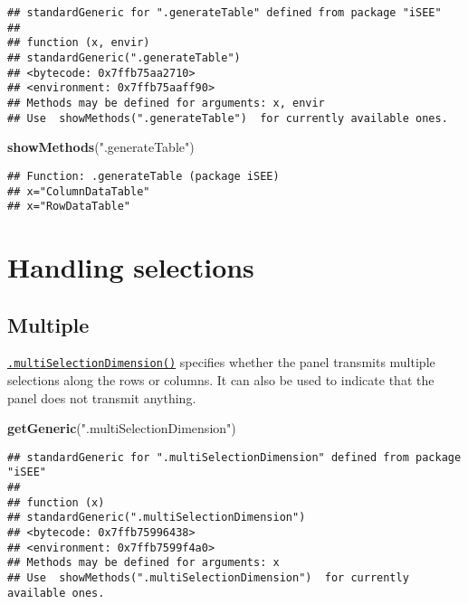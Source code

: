 \documentclass[
]{book}
\newenvironment{Shaded}{\begin{snugshade}}{\end{snugshade}}
\newcommand{\KeywordTok}[1]{\textcolor[rgb]{0.13,0.29,0.53}{\textbf{#1}}}
\newcommand{\NormalTok}[1]{#1}
\newcommand{\StringTok}[1]{\textcolor[rgb]{0.31,0.60,0.02}{#1}}
\begin{document}
\begin{verbatim}
## standardGeneric for ".generateTable" defined from package "iSEE"
## 
## function (x, envir) 
## standardGeneric(".generateTable")
## <bytecode: 0x7ffb75aa2710>
## <environment: 0x7ffb75aaff90>
## Methods may be defined for arguments: x, envir
## Use  showMethods(".generateTable")  for currently available ones.
\end{verbatim}

\begin{Shaded}
\begin{Highlighting}[]
\KeywordTok{showMethods}\NormalTok{(}\StringTok{".generateTable"}\NormalTok{)}
\end{Highlighting}
\end{Shaded}

\begin{verbatim}
## Function: .generateTable (package iSEE)
## x="ColumnDataTable"
## x="RowDataTable"
\end{verbatim}

\hypertarget{handling-selections}{%
\section{Handling selections}\label{handling-selections}}

\hypertarget{multiple}{%
\subsection{Multiple}\label{multiple}}

\href{https://isee.github.io/iSEE/reference/multi-select-generics.html}{\texttt{.multiSelectionDimension()}} specifies whether the panel transmits multiple selections along the rows or columns.
It can also be used to indicate that the panel does not transmit anything.

\begin{Shaded}
\begin{Highlighting}[]
\KeywordTok{getGeneric}\NormalTok{(}\StringTok{".multiSelectionDimension"}\NormalTok{)}
\end{Highlighting}
\end{Shaded}

\begin{verbatim}
## standardGeneric for ".multiSelectionDimension" defined from package "iSEE"
## 
## function (x) 
## standardGeneric(".multiSelectionDimension")
## <bytecode: 0x7ffb75996438>
## <environment: 0x7ffb7599f4a0>
## Methods may be defined for arguments: x
## Use  showMethods(".multiSelectionDimension")  for currently available ones.
\end{verbatim}
\end{document}
